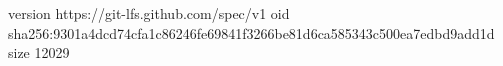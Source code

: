 version https://git-lfs.github.com/spec/v1
oid sha256:9301a4dcd74cfa1c86246fe69841f3266be81d6ca585343c500ea7edbd9add1d
size 12029
